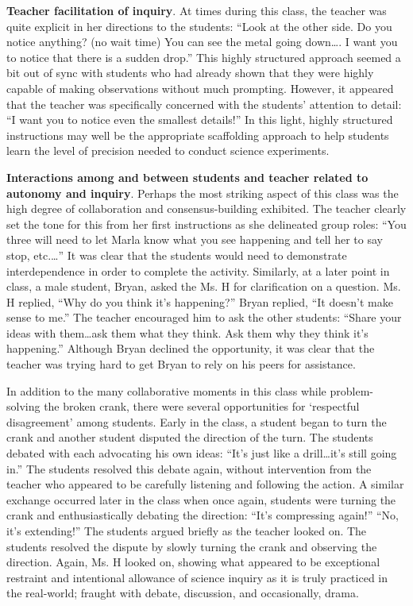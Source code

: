 \documentclass[11.5pt]{sig-alternate} %
\begin{document}
\begin{large}
\textbf{Teacher facilitation of inquiry}. At times during this class, the teacher was quite explicit in her directions to the students: “Look at the other side. Do you notice anything? (no wait time) You can see the metal going down…. I want you to notice that there is a sudden drop.” This highly structured approach seemed a bit out of sync with students who had already shown that they were highly capable of making observations without much prompting.  However, it appeared that the teacher was specifically concerned with the students’ attention to detail: “I want you to notice even the smallest details!” In this light, highly structured instructions may well be the appropriate scaffolding approach to help students learn the level of precision needed to conduct science experiments.

\textbf{Interactions among and between students and teacher related to autonomy and inquiry}. Perhaps the most striking aspect of this class was the high degree of collaboration and consensus-building exhibited.  The teacher clearly set the tone for this from her first instructions as she delineated group roles: “You three will need to let Marla know what you see happening and tell her to say stop, etc.…” It was clear that the students would need to demonstrate interdependence in order to complete the activity.  Similarly, at a later point in class, a male student, Bryan, asked the Ms. H for clarification on a question.  Ms. H replied, “Why do you think it’s happening?” Bryan replied, “It doesn’t make sense to me.” The teacher encouraged him to ask the other students: “Share your ideas with them…ask them what they think.  Ask them why they think it’s happening.” Although Bryan declined the opportunity, it was clear that the teacher was trying hard to get Bryan to rely on his peers for assistance.  

In addition to the many collaborative moments in this class while problem-solving the broken crank, there were several opportunities for ‘respectful disagreement’ among students.  Early in the class, a student began to turn the crank and another student disputed the direction of the turn.  The students debated with each advocating his own ideas: “It’s just like a drill…it’s still going in.”  The students resolved this debate again, without intervention from the teacher who appeared to be carefully listening and following the action. A similar exchange occurred later in the class when once again, students were turning the crank and enthusiastically debating the direction: “It’s compressing again!” “No, it’s extending!” The students argued briefly as the teacher looked on.  The students resolved the dispute by slowly turning the crank and observing the direction.  Again, Ms. H looked on, showing what appeared to be exceptional restraint and intentional allowance of science inquiry as it is truly practiced in the real-world; fraught with debate, discussion, and occasionally, drama.


\end{large}
\end{document}
